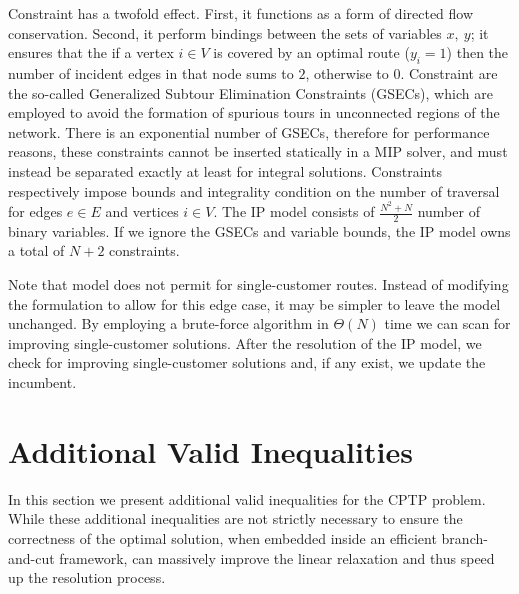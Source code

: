 Constraint  has a twofold effect.
First, it functions as a form of directed flow conservation.
Second, it perform bindings between the sets of variables $x,\ y$;
it ensures that the if a vertex $i \in V$ is covered by an optimal route ($y_i = 1$)
then the number of incident edges in that node sums to $2$, otherwise to $0$.
Constraint  are the so-called Generalized Subtour Elimination Constraints (GSECs),
which are employed to avoid the formation of spurious tours in unconnected regions of the network.
There is an exponential number of GSECs,
therefore for performance reasons,
these constraints cannot be inserted statically in a MIP solver,
and must instead be separated exactly at least for integral solutions.
Constraints  respectively
impose bounds and integrality condition
on the number of traversal for edges $e \in E$ and vertices $i \in V$.
The IP model consists of $\frac{N^2 + N}{2}$ number of binary variables.
If we ignore the GSECs and variable bounds, the IP model owns a total of $N + 2$ constraints.

\medskip

Note that model
does not permit for single-customer routes.
Instead of modifying the formulation to allow for this edge case,
it may be simpler to leave the model unchanged.
By employing a brute-force algorithm in $\Theta(N)$ time we can scan for improving single-customer solutions.
After the resolution of the IP model,
we check for improving single-customer solutions and,
if any exist,
we update the incumbent.

\section{Additional Valid Inequalities}
\label{sec:cptp-additional-valid-inequalities}

In this section we present additional valid inequalities for the CPTP problem.
While these additional inequalities are not strictly necessary
to ensure the correctness of the optimal solution,
when embedded inside an efficient branch-and-cut framework,
can massively improve the linear relaxation and thus speed up the resolution process.

